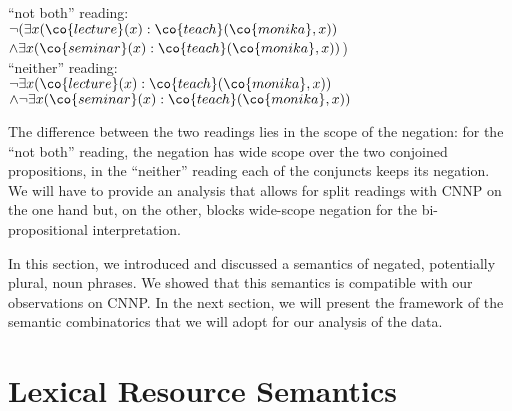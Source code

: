 \documentclass[output=paper]{langsci/langscibook}
\begin{document}
\ea \label{lf-notboth}\label{lf-neither}
\begin{xlist}
\ex 
``not both'' reading:\\ 
\hspace*{-1.5em}
$\lnot (\exists x (\co{lecture}(x) : \co{teach}(\co{monika},x))$\\
\hspace*{1em}$
\land \exists x (\co{seminar}(x) : \co{teach}(\co{monika},x))$)\\
\ex ``neither'' reading:\\ 
\hspace*{-1.5em}
$\lnot \exists x (\co{lecture}(x) : \co{teach}(\co{monika},x))$\\
\hspace*{1em}$
\land \lnot \exists x (\co{seminar}(x) : \co{teach}(\co{monika},x))$
\end{xlist}
\z 

\begin{sloppypar}
  The difference between the two readings lies in the scope of the
  negation: for the ``not both'' reading, the negation has wide scope
  over the two conjoined propositions, in the ``neither'' reading each
  of the conjuncts keeps its negation. We will have to provide an
  analysis that allows for split readings with CNNP on the one hand
  but, on the other, blocks wide-scope negation for the
  bi-propositional interpretation.
\end{sloppypar}

\bigskip
In this section, we introduced and discussed a semantics of negated, potentially plural, noun phrases. We showed that this semantics is  compatible with our observations on  CNNP. 
In the next section, we will present the framework  of the semantic combinatorics that we will adopt for our analysis of the data.

\section{Lexical Resource Semantics}
\label{Sec-LRS}
\end{document}
